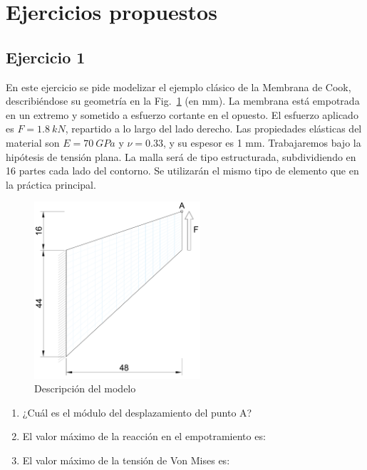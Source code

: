 \section{Ejercicios propuestos}

\subsection{Ejercicio 1}

En este ejercicio se pide modelizar el ejemplo clásico de la Membrana de Cook, describiéndose su geometría en la Fig.~\ref{figu120} (en mm). La membrana está empotrada en un extremo y sometido a esfuerzo cortante en el opuesto. El esfuerzo aplicado es $F=1.8\ kN$, repartido a lo largo del lado derecho. Las propiedades elásticas del material son $E=70\ GPa$ y $\nu=0.33$, y su espesor es 1 mm. Trabajaremos bajo la hipótesis de tensión plana.
La malla será de tipo estructurada, subdividiendo en 16 partes cada lado del contorno. Se utilizarán el mismo tipo de elemento que en la práctica principal. 
\begin{figure}[!h]
  \begin{center}
    \includegraphics[width=0.55\textwidth]{./body/images/membrana1}
  \end{center}
  \caption{Descripción del modelo}
  \label{figu120}
\end{figure}
\begin{enumerate}
\item ¿Cuál es el módulo del desplazamiento del punto A?
  \begin{multicols}{4}
\columnbreak
{}
\columnbreak
{}
\columnbreak
{}
  \end{multicols}
\item El valor máximo de la reacción en el empotramiento es:
  \begin{multicols}{4}
\columnbreak
{} %
\columnbreak
{}
\columnbreak
{}
  \end{multicols}
\item El valor máximo de la tensión de Von Mises es:
  \begin{multicols}{4}
\columnbreak
{} %
\columnbreak
{}
\columnbreak
{}
\end{multicols}
\end{enumerate}


